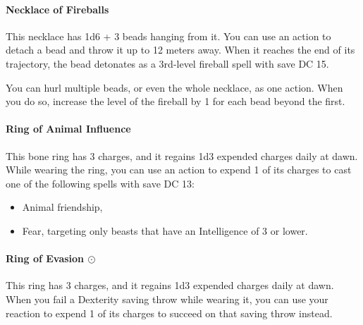     \paragraph{Necklace of Fireballs}
        This necklace has 1d6 + 3 beads hanging from it. You can use an action to detach a bead and throw it up to 12 meters away.
        When it reaches the end of its trajectory, the bead detonates as a 3rd-level fireball spell with save DC 15.

        You can hurl multiple beads, or even the whole necklace, as one action.
        When you do so, increase the level of the fireball by 1 for each bead beyond the first.
    \paragraph{Ring of Animal Influence}
        This bone ring has 3 charges, and it regains 1d3 expended charges daily at dawn.
        While wearing the ring, you can use an action to expend 1 of its charges to cast one of the following spells with save DC 13:
        \begin{itemize}
            \item Animal friendship,
            \item Fear, targeting only beasts that have an Intelligence of 3 or lower.
        \end{itemize}
    \paragraph{Ring of Evasion $\odot$}
        This ring has 3 charges, and it regains 1d3 expended charges daily at dawn.
        When you fail a Dexterity saving throw while wearing it, you can use your reaction to expend 1 of its charges to succeed on that saving throw instead.
